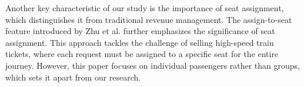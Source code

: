 Another key characteristic of our study is the importance of seat assignment, which distinguishes it from traditional revenue management. The assign-to-seat feature introduced by Zhu et al. \cite{zhu2023assign} further emphasizes the significance of seat assignment. This approach tackles the challenge of selling high-speed train tickets, where each request must be assigned to a specific seat for the entire journey. However, this paper focuses on individual passengers rather than groups, which sets it apart from our research.














\newpage
